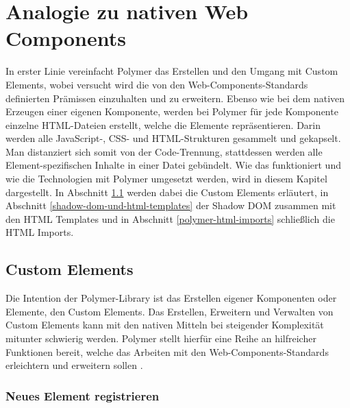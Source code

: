 \chapter{Analogie zu nativen Web Components}\label{analogie-zu-nativen-web-components}

In erster Linie vereinfacht Polymer das Erstellen und den Umgang mit Custom Elements, wobei versucht wird die von den Web-Components-Standards definierten Prämissen einzuhalten und zu erweitern. Ebenso wie bei dem nativen Erzeugen einer eigenen Komponente, werden bei Polymer für jede Komponente einzelne \ac{HTML}-Dateien erstellt, welche die Elemente repräsentieren. Darin werden alle JavaScript-, \ac{CSS}- und \ac{HTML}-Strukturen gesammelt und gekapselt. Man distanziert sich somit von der Code-Trennung, stattdessen werden alle Element-spezifischen Inhalte in einer Datei gebündelt. Wie das funktioniert und wie die Technologien mit Polymer umgesetzt werden, wird in diesem Kapitel dargestellt. In Abschnitt \ref{polymer-custom-elements} werden dabei die Custom Elements erläutert, in Abschnitt \ref{shadow-dom-und-html-templates} der Shadow \ac{DOM} zusammen mit den \ac{HTML} Templates und in Abschnitt \ref{polymer-html-imports} schließlich die \ac{HTML} Imports.


\section{Custom Elements}\label{polymer-custom-elements}

Die Intention der Polymer-Library ist das Erstellen eigener Komponenten oder Elemente, den Custom Elements. Das Erstellen, Erweitern und Verwalten von Custom Elements kann mit den nativen Mitteln bei steigender Komplexität mitunter schwierig werden. Polymer stellt hierfür eine Reihe an hilfreicher Funktionen bereit, welche das Arbeiten mit den Web-Components-Standards erleichtern und erweitern sollen \cite{citeulike:13915080}.


\subsection{Neues Element registrieren}\label{neues-element-registrieren}


